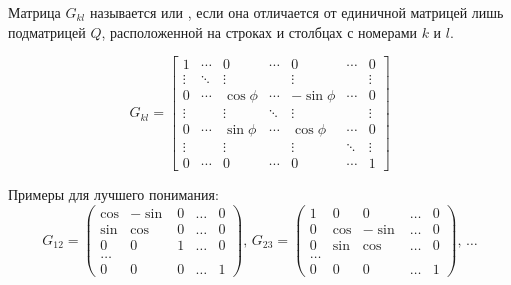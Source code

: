 \begin{definition}
    Матрица $G_{kl}$ называется  или
    , если она отличается от единичной матрицей лишь подматрицей $Q$,
    расположенной на строках и столбцах с номерами $k$ и $l$.

    \[
        G_{kl}=
        \left[\begin{array}{ccccccc}
                1      & \cdots & 0         & \cdots & 0          & \cdots & 0      \\
                \vdots & \ddots & \vdots    &        & \vdots     &        & \vdots \\
                0      & \cdots & \cos \phi & \cdots & -\sin \phi & \cdots & 0      \\
                \vdots &        & \vdots    & \ddots & \vdots     &        & \vdots \\
                0      & \cdots & \sin \phi & \cdots & \cos \phi  & \cdots & 0      \\
                \vdots &        & \vdots    &        & \vdots     & \ddots & \vdots \\
                0      & \cdots & 0         & \cdots & 0          & \cdots & 1
            \end{array}\right]
    \]

    Примеры для лучшего понимания:
    \[
        G_{12}=\left(
        \begin{array}{ccccc}
                \cos & -\sin & 0 & \ldots & 0 \\
                \sin & \cos  & 0 & \ldots & 0 \\
                0    & 0     & 1 & \ldots & 0 \\
                \ldots                        \\
                0    & 0     & 0 & \ldots & 1
            \end{array}
        \right),\,
        G_{23}=\left(
        \begin{array}{ccccc}
                1 & 0    & 0     & \ldots & 0 \\
                0 & \cos & -\sin & \ldots & 0 \\
                0 & \sin & \cos  & \ldots & 0 \\
                \ldots                        \\
                0 & 0    & 0     & \ldots & 1
            \end{array}
        \right),\,\ldots
    \]
\end{definition}

